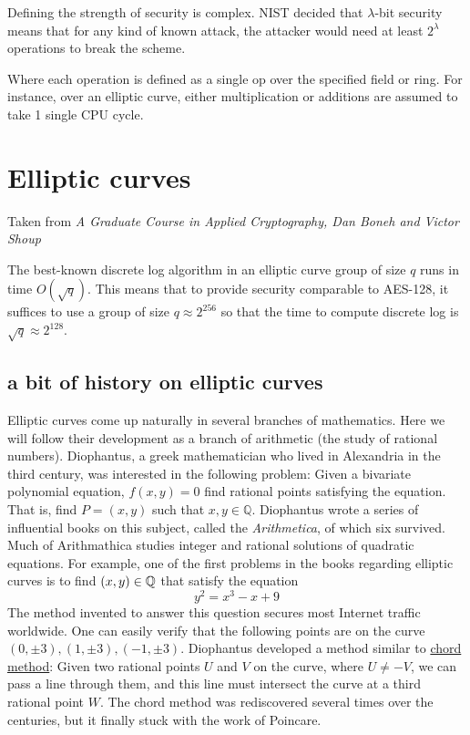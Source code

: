 
\begin{defn}
  Defining the strength of security is complex. NIST decided that $\lambda$-bit security 
  means that for any kind of known attack, the attacker would need at least $2^{\lambda}$
  operations to break the scheme.

  Where each operation is defined as a single op over the specified field or ring.
  For instance, over an elliptic curve, either multiplication or additions are assumed to 
  take 1 single CPU cycle.
  
\end{defn}


\chapter{Elliptic curves}
Taken from \emph{A Graduate Course in Applied Cryptography, Dan Boneh and Victor Shoup}

The best-known discrete log algorithm in an elliptic curve group of size $q$ runs in time $O(\sqrt{q})$. 
This means that to provide security comparable to AES-128, it suffices to use a group of size $q \approx 2^{256}$ 
so that the time to compute discrete log is $\sqrt{q} \approx 2^{128}$.

\section{a bit of history on elliptic curves}
Elliptic curves come up naturally in several branches of mathematics.
Here we will follow their development as a branch of arithmetic (the study of rational numbers).
Diophantus, a greek mathematician who lived in Alexandria in the third century, was interested 
in the following problem: Given a bivariate polynomial equation, $f(x,y)=0$ find 
rational points satisfying the equation. That is, find $P=(x,y)$ such that $x,y\in\mathbb{Q}$.
Diophantus wrote a series of influential books on this subject, called the \emph{Arithmetica}, of which six survived.
Much of Arithmathica studies integer and rational solutions of quadratic equations.
For example, one of the first problems in the books regarding elliptic curves is to find $(x,y) \in \mathbb{Q}$
 that satisfy the equation $$ y^{2}=x^3 - x + 9$$
The method invented to answer this question secures most Internet traffic worldwide.
One can easily verify that the following points are on the curve $(0, \pm3), (1, \pm3), (-1, \pm 3)$.
Diophantus developed a method similar to \underline{chord method}:
Given two rational points $U$ and $V$ on the curve, where $U\neq -V$, we can pass a line through them,
 and this line must intersect the curve at a third rational point $W$. 
The chord method was rediscovered several times over the centuries, but it finally stuck with the work of Poincare.

